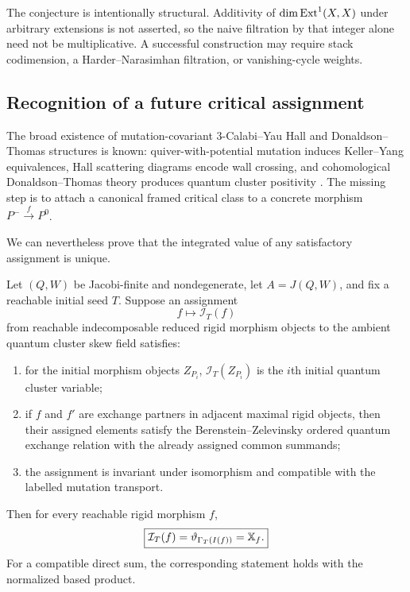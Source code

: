 The conjecture is intentionally structural.  Additivity of
$\dim\operatorname{Ext}^1(X,X)$ under arbitrary extensions is not asserted, so the naive
filtration by that integer alone need not be multiplicative.  A successful
construction may require stack codimension, a Harder--Narasimhan filtration,
or vanishing-cycle weights.

\subsection{Recognition of a future critical assignment}

The broad existence of mutation-covariant $3$-Calabi--Yau Hall and
Donaldson--Thomas structures is known: quiver-with-potential mutation induces
Keller--Yang equivalences, Hall scattering diagrams encode wall crossing, and
cohomological Donaldson--Thomas theory produces quantum cluster positivity
\cite{KellerYang,BridgelandScattering,Davison}.  The missing step is to attach
a canonical framed critical class to a concrete morphism
$P^-\xrightarrow fP^0$.

We can nevertheless prove that the integrated value of any satisfactory
assignment is unique.

\begin{theorem}
\label{thm:critical-recognition}
Let $(Q,W)$ be Jacobi-finite and nondegenerate, let
$A=J(Q,W)$, and fix a reachable initial seed $T$.  Suppose an assignment
\[
 f\longmapsto\mathcal I_T(f)
\]
from reachable indecomposable reduced rigid morphism objects to the ambient
quantum cluster skew field satisfies:
\begin{enumerate}[label=(\roman*),leftmargin=2.3em]
\item for the initial morphism objects $Z_{P_i}$,
      $\mathcal I_T(Z_{P_i})$ is the $i$th initial quantum cluster variable;
\item if $f$ and $f'$ are exchange partners in adjacent maximal rigid objects,
      then their assigned elements satisfy the Berenstein--Zelevinsky ordered
      quantum exchange relation with the already assigned common summands;
\item the assignment is invariant under isomorphism and compatible with the
      labelled mutation transport.
\end{enumerate}
Then for every reachable rigid morphism $f$,
\begin{equation}
 \boxed{
 \mathcal I_T(f)=\vartheta_{\Gamma_T(I(f))}=\mathbb X_f.}
 \label{eq:critical-recognition}
\end{equation}
For a compatible direct sum, the corresponding statement holds with the
normalized based product.
\end{theorem}

